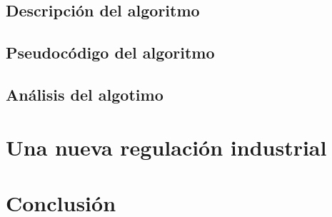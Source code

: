 \documentclass{article}
\begin{document}
\subsection{Descripción del algoritmo}

\subsection{Pseudocódigo del algoritmo}

\subsection{Análisis del algotimo}

\section{Una nueva regulación industrial}
\section{Conclusión}
\end{document}
